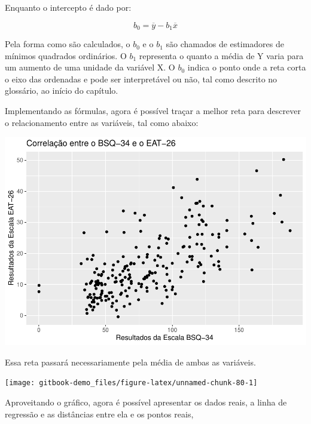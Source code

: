 \documentclass[
]{book}
\begin{document}
Enquanto o intercepto é dado por:

\[b_0 = \overline{y} - b_1 \overline{x}\]

Pela forma como são calculados, o \(b_0\) e o \(b_1\) são chamados de estimadores de mínimos quadrados ordinários. O \(b_1\) representa o quanto a média de Y varia para um aumento de uma unidade da variável X. O \(b_0\) indica o ponto onde a reta corta o eixo das ordenadas e pode ser
interpretável ou não, tal como descrito no glossário, ao início do capítulo.

Implementando as fórmulas, agora é possível traçar a melhor reta para descrever o relacionamento entre as variáveis, tal como abaixo:

\begin{center}\includegraphics{gitbook-demo_files/figure-latex/unnamed-chunk-79-1} \end{center}

Essa reta passará necessariamente pela média de ambas as variáveis.

\begin{center}\texttt{[image: gitbook-demo\_files/figure-latex/unnamed-chunk-80-1]} \end{center}

Aproveitando o gráfico, agora é possível apresentar os dados reais, a linha de regressão e as distâncias entre ela e os pontos reais,
\end{document}
